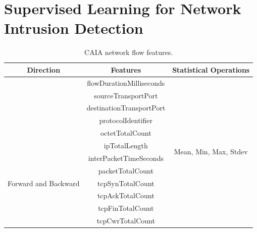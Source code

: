 \documentclass[conference]{IEEEtran}
\begin{document}
 
\section{Supervised Learning for Network Intrusion Detection}

\begin{table}[ht!]
	
	\centering
	\caption{CAIA network flow features.}
	\label{tab:cres}
	     
	\footnotesize
	\begin{tabular}{ccc}
		\toprule
		\textbf{Direction}                    & \textbf{Features}        & \textbf{Statistical Operations}        \\
		\midrule
		    
		                                      & flowDurationMilliseconds &                                        \\
		                                      & sourceTransportPort      &                                        \\
		                                      & destinationTransportPort &                                        \\
		                                      & protocolIdentifier       &                                        \\
		                                      & octetTotalCount          &                                        \\
		\midrule
		\multirow{7}{*}{Forward and Backward} & ipTotalLength            & \multirow{2}{*}{Mean, Min, Max, Stdev} \\
		                                      & interPacketTimeSeconds   &                                        \\
		\cmidrule{2-3}
		                                      & packetTotalCount         &                                        \\
		                                      & tcpSynTotalCount         &                                        \\
		                                      & tcpAckTotalCount         &                                        \\
		                                      & tcpFinTotalCount         &                                        \\
		                                      & tcpCwrTotalCount         &                                        \\
		   
		\midrule
		
		
	\end{tabular}
		
\end{table}
\end{document}
